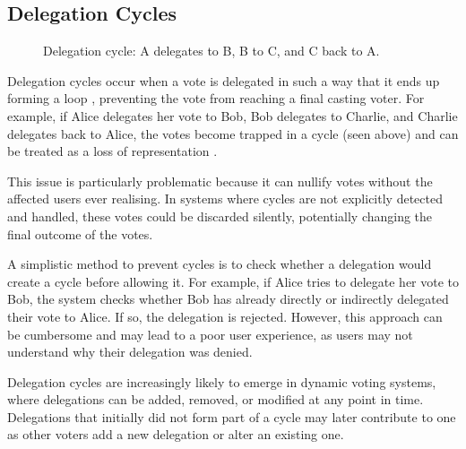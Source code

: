 \subsection*{Delegation Cycles}\label{subsec:delegation_cycles}
\begin{figure}[H]
  \centering
  \caption{Delegation cycle: A delegates to B, B to C, and C back to A.}
  \label{fig:triangle-cycle}
\end{figure}


Delegation cycles occur when a vote is delegated in such a way that it ends up forming a loop \citep{brill_liquid_2022}, preventing the vote from reaching a final casting voter. For example, if Alice delegates her vote to Bob, Bob delegates to Charlie, and Charlie delegates back to Alice, the votes become trapped in a cycle (seen above) and can be treated as a loss of representation \citep{christoff2017liquiddemocracyanalysisbinary}.

This issue is particularly problematic because it can nullify votes without the affected users ever realising. In systems where cycles are not explicitly detected and handled, these votes could be discarded silently, potentially changing the final outcome of the votes.

A simplistic method to prevent cycles is to check whether a delegation would create a cycle before allowing it. For example, if Alice tries to delegate her vote to Bob, the system checks whether Bob has already directly or indirectly delegated their vote to Alice. If so, the delegation is rejected. However, this approach can be cumbersome and may lead to a poor user experience, as users may not understand why their delegation was denied.

Delegation cycles are increasingly likely to emerge in dynamic voting systems, where delegations can be added, removed, or modified at any point in time. Delegations that initially did not form part of a cycle may later contribute to one as other voters add a new delegation or alter an existing one.

